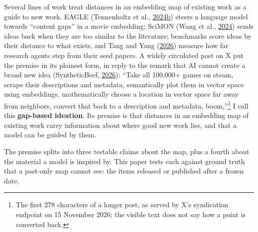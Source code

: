 \documentclass[
  10pt,
]{article}
\begin{document}
Several lines of work treat distances in
an embedding map of existing work as a
guide to new work. EAGLE (Tennenholtz et
al.,
\hyperlink{ref-Tennenholtz2024b}{2024b})
steers a language model towards
``content gaps'' in a movie embedding;
SciMON (Wang et al.,
\hyperlink{ref-Wang2024}{2024}) sends
ideas back when they are too similar to
the literature; benchmarks score ideas
by their distance to what exists, and
Tang and Yang
(\hyperlink{ref-Tang2026}{2026}) measure
how far research agents step from their
seed papers. A widely circulated post on
X put the premise in its plainest form,
in reply to the remark that AI cannot
create a brand new idea (SyntheticBeef,
\hyperlink{ref-SyntheticBeef2026}{2026}):
``Take all 100,000+ games on steam,
scrape their descriptions and metadata,
semantically plot them in vector space
using embeddings, mathematically choose
a location in vector space far away from
neighbors, convert that back to a
description and metadata,
boom,''\footnote{The first 278
  characters of a longer post, as served
  by X's syndication endpoint on 15
  November 2026; the visible text does
  not say how a point is converted back.}
I call this \textbf{gap-based ideation}.
Its premise is that distances in an
embedding map of existing work carry
information about where good new work
lies, and that a model can be guided by
them.

The premise splits into three testable
claims about the map, plus a fourth
about the material a model is inspired
by. This paper tests each against ground
truth that a past-only map cannot see:
the items released or published after a
frozen date.
\end{document}
